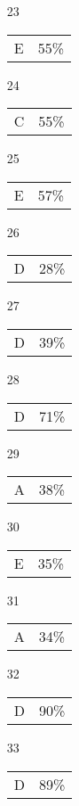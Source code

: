 \documentclass{article}
\begin{document}
\begin{multicols}{4}
\begin{enumerate}
    \item[23] \begin{tabular}{cc} E & 55\%\end{tabular}
    
    \item[24] \begin{tabular}{cc} C & 55\%\end{tabular}
    
    \item[25] \begin{tabular}{cc} E & 57\%\end{tabular}
    
       \item[]
    
    \item[26] \begin{tabular}{cc} D & 28\%\end{tabular}
    
    \item[27] \begin{tabular}{cc} D & 39\%\end{tabular}
    
    \item[28] \begin{tabular}{cc} D & 71\%\end{tabular}
    
    \item[29] \begin{tabular}{cc} A & 38\%\end{tabular}
    
    \item[30] \begin{tabular}{cc} E & 35\%\end{tabular}
    
       \item[]
    
    \item[31] \begin{tabular}{cc} A & 34\%\end{tabular}
    
    \item[32] \begin{tabular}{cc} D & 90\%\end{tabular}
    
    \item[33] \begin{tabular}{cc} D & 89\%\end{tabular}
    

\end{enumerate}
\end{multicols}
\end{document}
